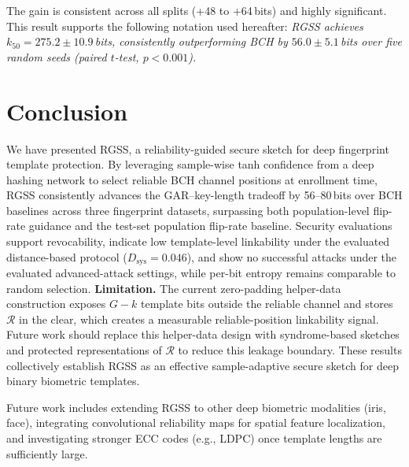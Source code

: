 \documentclass[journal]{IEEEtran}
\newcommand{\TODO}[1]{\textcolor{red}{[TODO: #1]}}
\begin{document}
The gain is consistent across all splits (+48 to +64\,bits) and
highly significant.
This result supports the following notation used hereafter:
\emph{RGSS achieves $k_{50} = 275.2 \pm 10.9$\,bits, consistently
outperforming BCH by $56.0 \pm 5.1$\,bits over five random seeds
(paired $t$-test, $p < 0.001$).}

\section{Conclusion}
\label{sec:conclusion}

We have presented RGSS, a reliability-guided secure sketch for
deep fingerprint template protection.
By leveraging sample-wise tanh confidence from a deep hashing network
to select reliable BCH channel positions at enrollment time, RGSS
consistently advances the GAR--key-length tradeoff by 56--80\,bits
over BCH baselines across three fingerprint datasets, surpassing
both population-level flip-rate guidance and the test-set population flip-rate baseline.
Security evaluations support revocability, indicate low
template-level linkability under the evaluated distance-based
protocol ($D_\text{sys}\!=\!0.046$), and show no successful attacks
under the evaluated advanced-attack settings, while per-bit entropy
remains comparable to random selection.
\noindent\textbf{Limitation.}
The current zero-padding helper-data construction exposes $G-k$
template bits outside the reliable channel and stores
$\mathcal{R}$ in the clear, which creates a measurable
reliable-position linkability signal.
Future work should replace this helper-data design with
syndrome-based sketches and protected representations of
$\mathcal{R}$ to reduce this leakage boundary.
These results collectively establish RGSS as an effective
sample-adaptive secure sketch for deep binary biometric templates.

Future work includes extending RGSS to other deep biometric
modalities (iris, face), integrating convolutional reliability
maps for spatial feature localization, and investigating stronger
ECC codes (e.g., LDPC) once template lengths are sufficiently large.

\end{document}
